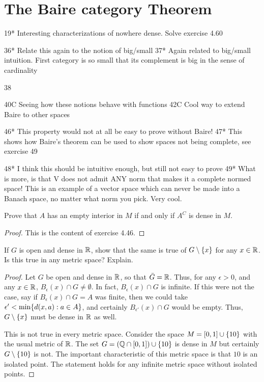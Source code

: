 \section{The Baire category Theorem}

19* Interesting characterizations of nowhere dense. Solve exercise 4.60

36* Relate this again to the notion of big/small 
37* Again related to big/small intuition. First category is so small that its complement is big in the sense of cardinality 

38

40C Seeing how these notions behave with functions 
42C Cool way to extend Baire to other spaces 

46* This property would not at all be easy to prove without Baire!
47* This shows how Baire's theorem can be used to show spaces not being complete, see exercise 49

48* I think this should be intuitive enough, but still not easy to prove 
49* What is more, is that V does not admit ANY norm that makes it a complete normed space! This is an example of a vector space which can never be made into a Banach space, no matter what norm you pick. Very cool. 


\begin{exercise}{14}
Prove that $A$ has an empty interior in $M$ if and only if $A^C$ is dense in $M$.
\end{exercise}
\begin{proof}
This is the content of exercise 4.46.
\end{proof} 

\begin{exercise}{15}
If $G$ is open and dense in $\mathbb{R}$, show that the same is true of $G\setminus\{x\}$ for any $x\in\mathbb{R}$. 
Is this true in any metric space?
Explain.
\end{exercise}
\begin{proof}
Let $G$ be open and dense in $\mathbb{R}$, so that $\bar{G}=\mathbb{R}$.
Thus, for any $\epsilon>0$, and any $x\in\mathbb{R}$, $B_\epsilon(x)\cap G\neq \emptyset$.
In fact, $B_\epsilon(x)\cap G$ is infinite.
If this were not the case, say if $B_\epsilon(x)\cap G = A$ was finite, then we could take $\epsilon' < \min\{d(x,a): a\in A\}$, and certainly $B_{\epsilon'}(x)\cap G$ would be empty. 
Thus, $G\setminus\{x\}$ must be dense in $\mathbb{R}$ as well.

This is not true in every metric space.
Consider the space $M=[0,1]\cup \{10\}$ with the usual metric of $\mathbb{R}$.
The set $G = (\mathbb{Q}\cap[0,1]) \cup \{10\}$ is dense in $M$ but certainly $G\setminus\{10\}$ is not.
The important characteristic of this metric space is that $10$ is an isolated point.
The statement holds for any infinite metric space without isolated points.
\end{proof} 

